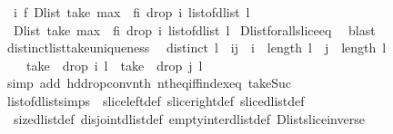 \begin{isabellebody}
\ \ {\isacharparenleft}{\isasymforall}i\ f{\isachardot}\ {\isacharparenleft}Dlist\ {\isacharparenleft}take\ {\isacharparenleft}max\ {}\ {\isacharparenleft}f{\isacharminus}i{\isacharparenright}{\isacharparenright}\ {\isacharparenleft}drop\ i\ {\isacharparenleft}list{\isacharunderscore}of{\isacharunderscore}dlist\ l{}{\isacharparenright}{\isacharparenright}{\isacharparenright}\ {\isacharequal}\ \isanewline
\ \ Dlist\ {\isacharparenleft}take\ {\isacharparenleft}max\ {}\ {\isacharparenleft}f{\isacharminus}i{\isacharparenright}{\isacharparenright}\ {\isacharparenleft}drop\ i\ {\isacharparenleft}list{\isacharunderscore}of{\isacharunderscore}dlist\ l{}{\isacharparenright}{\isacharparenright}{\isacharparenright}{\isacharparenright}{\isacharparenright}{\isachardoublequoteclose}\isanewline
%
\isadelimproof
%
\endisadelimproof
%
\isatagproof
{}\isamarkupfalse%
\ Dlist{\isacharunderscore}forall{\isacharunderscore}slice{\isacharunderscore}eq{}\ \isamarkupfalse%
\ blast%
\endisatagproof
{\isafoldproof}%
%
\isadelimproof
\isanewline
%
\endisadelimproof
\isanewline
{}\isamarkupfalse%
\ distinct{\isacharunderscore}list{\isacharunderscore}take{\isacharunderscore}{}{\isacharunderscore}uniqueness{\isacharcolon}\isanewline
\ \ {\isachardoublequoteopen}distinct\ l\ {\isasymLongrightarrow}\ i{\isasymnoteq}j\ {\isasymLongrightarrow}\ i\ {\isacharless}\ length\ l\ {\isasymLongrightarrow}\ j\ {\isacharless}\ length\ l\ {\isasymLongrightarrow}\isanewline
\ \ \ \ take\ {}\ {\isacharparenleft}drop\ i\ l{\isacharparenright}\ {\isasymnoteq}\ take\ {}\ {\isacharparenleft}drop\ j\ l{\isacharparenright}{\isachardoublequoteclose}\isanewline
%
\isadelimproof
%
\endisadelimproof
%
\isatagproof
{}\isamarkupfalse%
\ {\isacharparenleft}simp\ add{\isacharcolon}\ hd{\isacharunderscore}drop{\isacharunderscore}conv{\isacharunderscore}nth\ nth{\isacharunderscore}eq{\isacharunderscore}iff{\isacharunderscore}index{\isacharunderscore}eq\ take{\isacharunderscore}Suc{\isacharparenright}%
\endisatagproof
{\isafoldproof}%
%
\isadelimproof
\isanewline
%
\endisadelimproof
\isanewline
{}\isamarkupfalse%
\ list{\isacharunderscore}of{\isacharunderscore}dlist{\isacharunderscore}simps\ {\isacharequal}\ slice{\isacharunderscore}left{\isacharunderscore}def\ slice{\isacharunderscore}right{\isacharunderscore}def\ slice{\isacharunderscore}dlist{\isacharunderscore}def\ \isanewline
\ \ size{\isacharunderscore}dlist{\isacharunderscore}def\ disjoint{\isacharunderscore}dlist{\isacharunderscore}def\ empty{\isacharunderscore}inter{\isacharunderscore}dlist{\isacharunderscore}def\ Dlist{\isacharunderscore}slice{\isacharunderscore}inverse\ \isanewline

\end{isabellebody}
